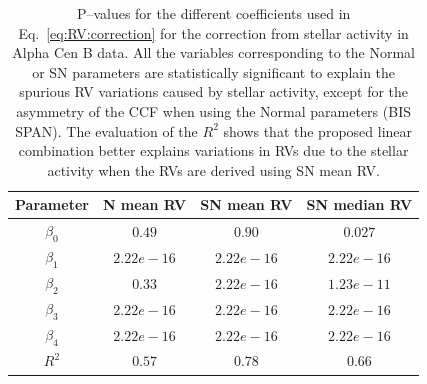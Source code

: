 \documentclass{aa}
\begin{document}
\begin{table}
\begin{center}
\caption{P--values for the different coefficients used in Eq.~\ref{eq:RV:correction} for the correction from stellar activity in Alpha Cen B data. All the variables corresponding to the Normal or SN parameters are statistically significant to explain the spurious RV variations caused by stellar activity, except for the asymmetry of the CCF when using the Normal parameters (BIS SPAN).
The evaluation of the $R^2$ shows that the proposed linear combination better explains variations in RVs due to the stellar activity when the RVs are derived using SN mean RV.}
\label{table:alphacent.test}
\begin{tabular}{|c|c|c|c|}
\hline
Parameter          & N mean RV         &   SN mean RV &   SN median RV \\
\hline
$\beta_{0}$            &    $0.49$    & $0.90 $  & $0.027$ \\
\hline
$\beta_{1}$            &    $2.22e-16$    & $2.22e-16 $  & $2.22e-16$ \\
\hline
$\beta_{2}$            &     $0.33$   & $2.22e-16 $ & $1.23e-11$\\
\hline
$\beta_{3}$            &     $ 2.22e-16$   &  $2.22e-16 $  & $ 2.22e-16$\\
\hline
$\beta_{4}$            &     $2.22e-16$   &  $2.22e-16 $ & $ 2.22e-16 $\\
\hline
$R^{2}$      &     $0.57$    &  $0.78$ & $0.66$  \\
\hline
\end{tabular}
\end{center}
\end{table}

\end{document}
